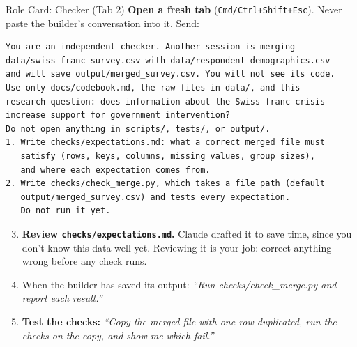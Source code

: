 %


\begin{frame}[fragile]{Role Card: Checker (Tab 2)}
  \footnotesize
  \textbf{Open a fresh tab} (\texttt{Cmd/Ctrl+Shift+Esc}). Never paste the builder's conversation into it. Send:

  \begin{lstlisting}[basicstyle=\ttfamily\scriptsize]
You are an independent checker. Another session is merging
data/swiss_franc_survey.csv with data/respondent_demographics.csv
and will save output/merged_survey.csv. You will not see its code.
Use only docs/codebook.md, the raw files in data/, and this
research question: does information about the Swiss franc crisis
increase support for government intervention?
Do not open anything in scripts/, tests/, or output/.
1. Write checks/expectations.md: what a correct merged file must
   satisfy (rows, keys, columns, missing values, group sizes),
   and where each expectation comes from.
2. Write checks/check_merge.py, which takes a file path (default
   output/merged_survey.csv) and tests every expectation.
   Do not run it yet.
  \end{lstlisting}

  \begin{enumerate}
    \setcounter{enumi}{2}
    \item \textbf{Review \texttt{checks/expectations.md}.} Claude drafted it to save time, since you don't know this data well yet. Reviewing it is your job: correct anything wrong before any check runs.
    \item When the builder has saved its output: \textit{``Run checks/check\_merge.py and report each result.''}
    \item \textbf{Test the checks:} \textit{``Copy the merged file with one row duplicated, run the checks on the copy, and show me which fail.''}
  \end{enumerate}
\end{frame}

